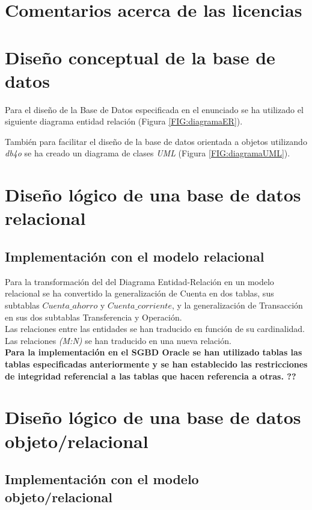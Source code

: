\documentclass{article}
\begin{document}
\section{Comentarios acerca de las licencias}

\section{Diseño conceptual de la base de datos}

Para el diseño de la Base de Datos especificada en el enunciado se ha utilizado el siguiente diagrama entidad relación (Figura \ref{FIG:diagramaER}).

También para facilitar el diseño de la base de datos orientada a objetos utilizando \emph{db4o} se ha creado un diagrama de clases \emph{UML} (Figura \ref{FIG:diagramaUML}).



\section{Diseño lógico de una base de datos relacional}

\subsection{Implementación con el modelo relacional}

Para la transformación del del Diagrama Entidad-Relación en un modelo relacional se ha convertido la generalización de Cuenta en dos tablas, sus subtablas $Cuenta\_ahorro$ y $Cuenta\_corriente$, y la generalización de Transacción en sus dos subtablas Transferencia y Operación.\\

Las relaciones entre las entidades se han traducido en función de su cardinalidad. Las relaciones \emph{(M:N)} se han traducido en una nueva relación.\\

\textbf{Para la implementación en el SGBD Oracle se han utilizado tablas las tablas especificadas anteriormente y se han establecido las restricciones de integridad referencial a las tablas que hacen referencia a otras. ??}

\section{Diseño lógico de una base de datos objeto/relacional}
\subsection{Implementación con el modelo objeto/relacional}
\end{document}
